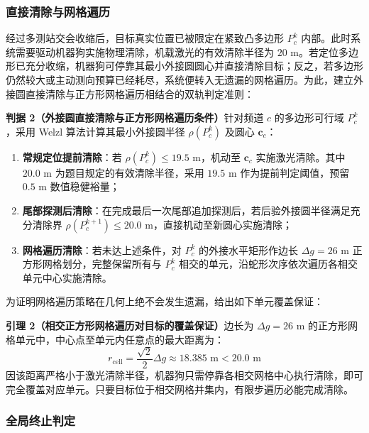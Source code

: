 \documentclass[zihao=-4,a4paper,UTF8]{ctexart}
\begin{document}
\subsubsection{直接清除与网格遍历}

经过多测站交会收缩后，目标真实位置已被限定在紧致凸多边形 $P_c^k$ 内部。此时系统需要驱动机器狗实施物理清除，机载激光的有效清除半径为 $20\text{ m}$。若定位多边形已充分收缩，机器狗可停靠其最小外接圆圆心并直接清除目标；反之，若多边形仍然较大或主动测向预算已经耗尽，系统便转入无遗漏的网格遍历。为此，建立外接圆直接清除与正方形网格遍历相结合的双轨判定准则：

\noindent\textbf{判据 2（外接圆直接清除与正方形网格遍历条件）}\quad 针对频道 $c$ 的多边形可行域 $P_c^k$，采用 Welzl 算法计算其最小外接圆半径 $\rho(P_c^k)$ 及圆心 $\mathbf{c}_c$：
\begin{enumerate}[leftmargin=2.2em, itemsep=0.03em, topsep=0.03em]
    \item \textbf{常规定位提前清除}：若 $\rho(P_c^k) \le 19.5\text{ m}$，机动至 $\mathbf{c}_c$ 实施激光清除。其中 $20.0\text{ m}$ 为题目规定的有效清除半径，采用 $19.5\text{ m}$ 作为提前判定阈值，预留 $0.5\text{ m}$ 数值稳健裕量；
    \item \textbf{尾部探测后清除}：在完成最后一次尾部追加探测后，若后验外接圆半径满足充分清除界 $\rho(P_c^{k+1}) \le 20.0\text{ m}$，直接机动至新圆心实施清除；
    \item \textbf{网格遍历清除}：若未达上述条件，对 $P_c^k$ 的外接水平矩形作边长 $\Delta g = 26\text{ m}$ 正方形网格划分，完整保留所有与 $P_c^k$ 相交的单元，沿蛇形次序依次遍历各相交单元中心实施清除。
\end{enumerate}

为证明网格遍历策略在几何上绝不会发生遗漏，给出如下单元覆盖保证：

\noindent\textbf{引理 2（相交正方形网格遍历对目标的覆盖保证）}\quad 边长为 $\Delta g = 26\text{ m}$ 的正方形网格单元中，中心点至单元内任意点的最大距离为：
\begin{equation}
    r_{\mathrm{cell}} = \frac{\sqrt{2}}{2} \Delta g \approx 18.385\text{ m} < 20.0\text{ m}
\end{equation}
因该距离严格小于激光清除半径，机器狗只需停靠各相交网格中心执行清除，即可完全覆盖对应单元。只要目标位于相交网格并集内，有限步遍历必能完成清除。

\subsubsection{全局终止判定}
\end{document}
